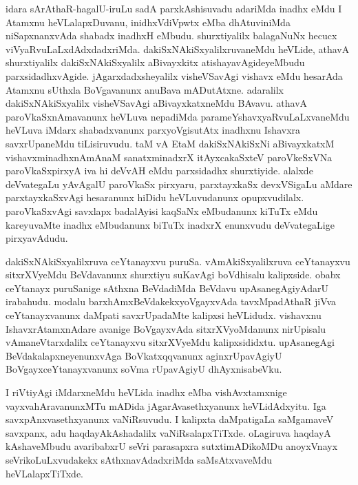 \begin{artha}
idara sArAthaR-hagalU-iruLu sadA parxkAshisuvadu adariMda inadhx eMdu I Atamxnu heVLalapxDuvanu, inidhxVdiVpwtx eMba dhAtuviniMda niSapxnanxvAda shabadx inadhxH eMbudu. shurxtiyalilx balagaNuNx hecucx viVyaRvuLaLxdAdxdadxriMda. dakiSxNAkiSxyalilxruvaneMdu heVLide, athavA shurxtiyalilx dakiSxNAkiSxyalilx aBivayxkitx atishayavAgideyeMbudu parxsidadhxvAgide. jAgarxdadxsheyalilx visheVSavAgi vishavx eMdu hesarAda Atamxnu sUthxla BoVgavanunx anuBava mADutAtxne. adaralilx dakiSxNAkiSxyalilx visheVSavAgi aBivayxkatxneMdu BAvavu. athavA paroVkaSxnAmavanunx heVLuva nepadiMda parameYshavxyaRvuLaLxvaneMdu heVLuva iMdarx shabadxvanunx parxyoVgisutAtx inadhxnu Ishavxra savxrUpaneMdu tiLisiruvudu. taM vA EtaM dakiSxNAkiSxNi aBivayxkatxM vishavxminadhxnAmAnaM sanatxminadxrX itAyxcakaSxteV paroVkeSxVNa paroVkaSxpirxyA iva hi deVvAH eMdu parxsidadhx shurxtiyide. alalxde deVvategaLu yAvAgalU paroVkaSx pirxyaru, parxtayxkaSx devxVSigaLu aMdare parxtayxkaSxvAgi hesaranunx hiDidu heVLuvudanunx opupxvudilalx. paroVkaSxvAgi savxlapx badalAyisi kaqSaNx eMbudanunx kiTuTx eMdu kareyuvaMte inadhx eMbudanunx biTuTx inadxrX enunxvudu deVvategaLige pirxyavAdudu. 
\end{artha}


\begin{artha}
dakiSxNAkiSxyalilxruva ceYtanayxvu puruSa. vAmAkiSxyalilxruva ceYtanayxvu sitxrXVyeMdu BeVdavanunx shurxtiyu suKavAgi boVdhisalu kalipxside. obabx ceYtanayx puruSanige sAthxna BeVdadiMda BeVdavu upAsanegAgiyAdarU irabahudu. modalu barxhAmxBeVdakekxyoVgayxvAda tavxMpadAthaR jiVva ceYtanayxvanunx daMpati savxrUpadaMte kalipxsi heVLidudx. vishavxnu IshavxrAtamxnAdare avanige BoVgayxvAda sitxrXVyoMdanunx nirUpisalu vAmaneVtarxdalilx ceYtanayxvu sitxrXVyeMdu kalipxsididxtu. upAsanegAgi BeVdakalapxneyenunxvAga BoVkatxqqvanunx aginxrUpavAgiyU BoVgayxceYtanayxvanunx soVma rUpavAgiyU dhAyxnisabeVku.
\end{artha}

\begin{artha}
I riVtiyAgi iMdarxneMdu heVLida inadhx eMba vishAvxtamxnige vayxvahAravanunxMTu mADida jAgarAvasethxyanunx heVLidAdxyitu. Iga savxpAnxvasethxyanunx vaNiRsuvudu. I kalipxta daMpatigaLa saMgamaveV savxpanx, adu haqdayAkAshadalilx vaNiRsalapxTiTxde. oLagiruva haqdayA kAshaveMbudu avaribabxrU seVri parasapxra sutxtimADikoMDu anoyxVnayx seVrikoLuLxvudakekx sAthxnavAdadxriMda saMsAtxvaveMdu heVLalapxTiTxde. 
\end{artha}

